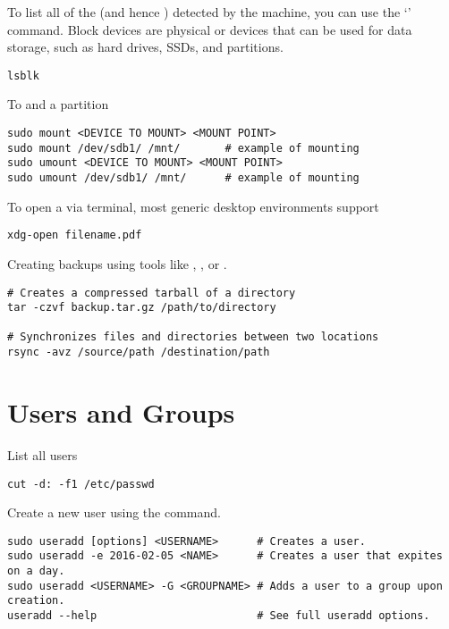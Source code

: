 To list all of the  (and hence ) detected by the machine, you can use the `' command. Block devices are physical or  devices that can be used for data storage, such as hard drives, SSDs, and partitions.\begin{lstlisting}
lsblk
\end{lstlisting}

To  and  a partition
\begin{lstlisting}
sudo mount <DEVICE TO MOUNT> <MOUNT POINT>
sudo mount /dev/sdb1/ /mnt/       # example of mounting
sudo umount <DEVICE TO MOUNT> <MOUNT POINT>
sudo umount /dev/sdb1/ /mnt/      # example of mounting
\end{lstlisting}


To open a  via terminal, most generic desktop environments support
\begin{lstlisting}
xdg-open filename.pdf
\end{lstlisting}

Creating backups using tools like , , or .
\begin{lstlisting}
# Creates a compressed tarball of a directory
tar -czvf backup.tar.gz /path/to/directory

# Synchronizes files and directories between two locations
rsync -avz /source/path /destination/path
\end{lstlisting}











\section{Users and Groups}

List all users
\begin{lstlisting}
cut -d: -f1 /etc/passwd
\end{lstlisting}

Create a new user using the  command.
\begin{lstlisting}
sudo useradd [options] <USERNAME>      # Creates a user.
sudo useradd -e 2016-02-05 <NAME>      # Creates a user that expites on a day.
sudo useradd <USERNAME> -G <GROUPNAME> # Adds a user to a group upon creation.
useradd --help                         # See full useradd options.
\end{lstlisting}

